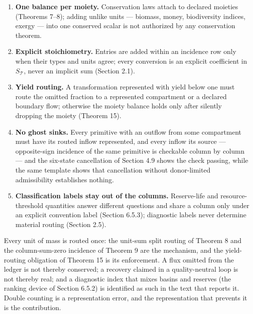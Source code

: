\documentclass[11pt]{article}
\providecommand{\tightlist}{\setlength{\itemsep}{0pt}\setlength{\parskip}{0pt}}
\begin{document}
\begin{enumerate}
\def\labelenumi{\arabic{enumi}.}
\tightlist
\item
  \textbf{One balance per moiety.} Conservation laws attach to declared
  moieties (Theorems 7--8); adding unlike units --- biomass, money,
  biodiversity indices, exergy --- into one conserved scalar is not
  authorized by any conservation theorem.
\item
  \textbf{Explicit stoichiometry.} Entries are added within an incidence
  row only when their types and units agree; every conversion is an
  explicit coefficient in \(S_{\mathcal{T}}\), never an implicit sum
  (Section 2.1).
\item
  \textbf{Yield routing.} A transformation represented with yield below
  one must route the omitted fraction to a represented compartment or a
  declared boundary flow; otherwise the moiety balance holds only after
  silently dropping the moiety (Theorem 15).
\item
  \textbf{No ghost sinks.} Every primitive with an outflow from some
  compartment must have its routed inflow represented, and every inflow
  its source --- opposite-sign incidence of the same primitive is
  checkable column by column --- and the six-state cancellation of
  Section 4.9 shows the check passing, while the same template shows
  that cancellation without donor-limited admissibility establishes
  nothing.
\item
  \textbf{Classification labels stay out of the columns.} Reserve-life
  and resource-threshold quantities answer different questions and share
  a column only under an explicit convention label (Section 6.5.3);
  diagnostic labels never determine material routing (Section 2.5).
\end{enumerate}

Every unit of mass is routed once: the unit-sum split routing of Theorem
8 and the column-sum-zero incidence of Theorem 9 are the mechanism, and
the yield-routing obligation of Theorem 15 is its enforcement. A flux
omitted from the ledger is not thereby conserved; a recovery claimed in
a quality-neutral loop is not thereby real; and a diagnostic index that
mixes basins and reserves (the ranking device of Section 6.5.2) is
identified as such in the text that reports it. Double counting is a
representation error, and the representation that prevents it is the
contribution.
\end{document}
